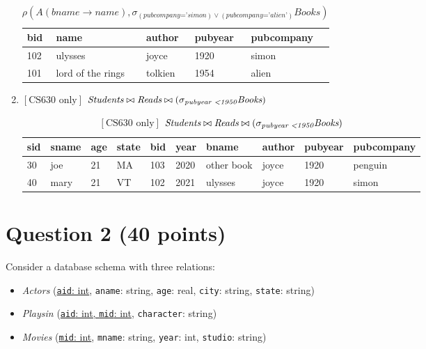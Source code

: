 \documentclass[letterpaper, 11pt]{article}
\begin{document}
\begin{enumerate}[label={\alph*})]
    \begin{table}[H]
        \centering
        \caption*{$\rho(A(\textit{bname} \to \textit{name}), \sigma_{(\textit{pubcompany='simon})\vee (\textit{pubcompany='alien'})} \textit{Books})$}
        \begin{tabular}{|l|l|l|l|l|}
        \hline
            \cellcolor[HTML]{b4c6e7} bid & \cellcolor[HTML]{b4c6e7} name & \cellcolor[HTML]{b4c6e7} author & \cellcolor[HTML]{b4c6e7} pubyear & \cellcolor[HTML]{b4c6e7} pubcompany \\
            \hline
            102 & ulysses & joyce & 1920 & simon \\
            \hline
            101 & lord of the rings & tolkien & 1954 & alien \\
            \hline
        \end{tabular}
    \end{table}
    \item $\left[\text{CS630 only}\right]$ $\textit{Students} \bowtie \textit{Reads} \bowtie (\sigma_{\textit{pubyear \textless 1950}}\textit{Books})$
    \begin{table}[H]
        \centering
        \caption*{$\left[\text{CS630 only}\right]$ $\textit{Students} \bowtie \textit{Reads} \bowtie (\sigma_{\textit{pubyear \textless 1950}}\textit{Books})$}
        \begin{tabular}{|l|l|l|l|l|l|l|l|l|l|}
            \hline
            \cellcolor[HTML]{b4c6e7} sid & \cellcolor[HTML]{b4c6e7} sname & \cellcolor[HTML]{b4c6e7} age & \cellcolor[HTML]{b4c6e7} state & \cellcolor[HTML]{b4c6e7} bid & \cellcolor[HTML]{b4c6e7} year & \cellcolor[HTML]{b4c6e7} bname & \cellcolor[HTML]{b4c6e7} author & \cellcolor[HTML]{b4c6e7} pubyear & \cellcolor[HTML]{b4c6e7} pubcompany \\
            \hline
            30 & joe & 21 & MA & 103 & 2020 & other book & joyce & 1920 & penguin \\
            \hline
            40 & mary & 21 & VT & 102 & 2021 & ulysses & joyce & 1920 & simon \\
            \hline
        \end{tabular}
    \end{table}
\end{enumerate}

\section*{Question 2 (40 points)}

Consider a database schema with three relations:
\begin{itemize}
    \item \textit{Actors} (\ul{\texttt{aid}: int}, \texttt{aname}: string, \texttt{age}: real, \texttt{city}: string, \texttt{state}: string)
    \item \textit{Playsin} (\ul{\texttt{aid}: int, \texttt{mid}: int}, \texttt{character}: string)
    \item \textit{Movies} (\ul{\texttt{mid}: int}, \texttt{mname}: string, \texttt{year}: int, \texttt{studio}: string)
\end{itemize}
\end{document}
